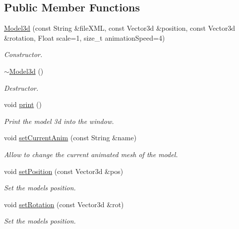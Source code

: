 \subsection*{Public Member Functions}
\begin{DoxyCompactItemize}
\item 
\hyperlink{classModel3d_a3382c1519f85b695a1d98b492207c339}{Model3d} (const String \&file\+X\+ML, const Vector3d \&position, const Vector3d \&rotation, Float scale=1, size\+\_\+t animation\+Speed=4)
\begin{DoxyCompactList}\small\item\em Constructor. \end{DoxyCompactList}\item 
\mbox{\label{classModel3d_a7a4ec3be34c901538574d99d95a46b04}} 
\hyperlink{classModel3d_a7a4ec3be34c901538574d99d95a46b04}{$\sim$\+Model3d} ()
\begin{DoxyCompactList}\small\item\em Destructor. \end{DoxyCompactList}\item 
\mbox{\label{classModel3d_ab1d6c9347c05323f85e5decb7e73cd1e}} 
void \hyperlink{classModel3d_ab1d6c9347c05323f85e5decb7e73cd1e}{print} ()
\begin{DoxyCompactList}\small\item\em Print the model 3d into the window. \end{DoxyCompactList}\item 
void \hyperlink{classModel3d_a29eeaa6769b0c21268f4704ac2d404b7}{set\+Current\+Anim} (const String \&name)
\begin{DoxyCompactList}\small\item\em Allow to change the current animated mesh of the model. \end{DoxyCompactList}\item 
void \hyperlink{classModel3d_a971b77ce978903443e71187ceafa1528}{set\+Position} (const Vector3d \&pos)
\begin{DoxyCompactList}\small\item\em Set the model\textquotesingle{}s position. \end{DoxyCompactList}\item 
void \hyperlink{classModel3d_adc3c185a679687b4bf483f89eb2c20a9}{set\+Rotation} (const Vector3d \&rot)
\begin{DoxyCompactList}\small\item\em Set the model\textquotesingle{}s position. \end{DoxyCompactList}\item 

\end{DoxyCompactItemize}

